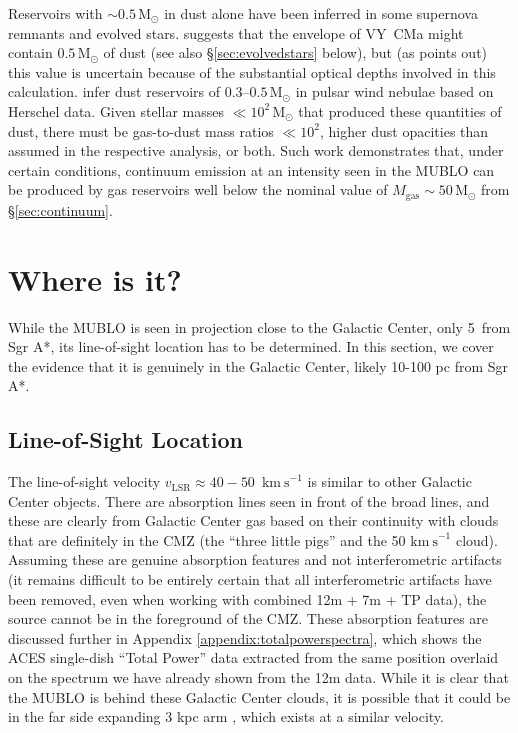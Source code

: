 \documentclass[]{aastex631}
\newcommand{\msun}{\ensuremath{\mathrm{M}_\odot}\xspace}
\newcommand{\kms}{\ensuremath{\mathrm{km~s}^{-1}}\xspace}
\begin{document}
Reservoirs with $\sim{}0.5\,\msun$ in dust alone have been inferred in some supernova remnants and evolved stars.
\citet{Kaminski2019} suggests that the envelope of VY~CMa might contain $0.5\,\msun$ of dust (see also \S \ref{sec:evolvedstars} below), but (as \citeauthor{Kaminski2019} points out) this value is uncertain because of the substantial optical depths involved in this calculation.
\citet{Chawner2019} infer dust reservoirs of 0.3--$0.5\,\msun$ in pulsar wind nebulae based on Herschel data.
Given stellar masses $\ll10^2\,\msun$ that produced these quantities of dust, there must be gas-to-dust mass ratios $\ll10^2$, higher dust opacities than assumed in the respective analysis, or both.
Such work demonstrates that, under certain conditions, continuum emission at an intensity seen in the MUBLO can be produced by gas reservoirs well below the nominal value of $M_\mathrm{gas}\sim{}50\,\msun$ from \S \ref{sec:continuum}.



\section{Where is it?}
\label{sec:where}

While the MUBLO is seen in projection close to the Galactic Center, only 5\arcmin~from Sgr A*, its line-of-sight location has to be determined.
In this section, we cover the evidence that it is genuinely in the Galactic Center, likely 10-100 pc from Sgr A*.

\subsection{Line-of-Sight Location}
\label{sec:los}
The line-of-sight velocity $v_\mathrm{LSR} \approx 40-50$~\kms is similar to other Galactic Center objects.
There are absorption lines seen in front of the broad lines, and these are clearly from Galactic Center gas based on their continuity with clouds that are definitely in the CMZ (the ``three little pigs'' and the 50 \kms cloud).
Assuming these are genuine absorption features and not interferometric artifacts (it remains difficult to be entirely certain that all interferometric artifacts have been removed, even when working with combined 12m + 7m + TP data), the source cannot be in the foreground of the CMZ.
These absorption features are discussed further in Appendix \ref{appendix:totalpowerspectra}, which shows the ACES single-dish ``Total Power'' data extracted from the same position overlaid on the spectrum we have already shown from the 12m data.
While it is clear that the MUBLO is behind these Galactic Center clouds, it is possible that it could be in the far side expanding 3 kpc arm \citep{Dame2008}, which exists at a similar velocity.  
\end{document}
